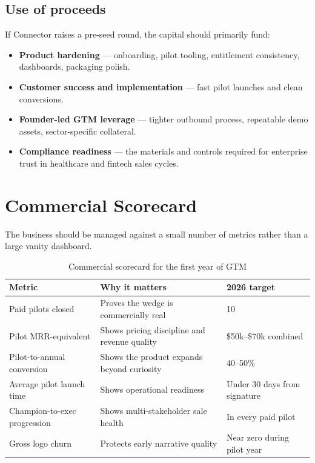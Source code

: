 \subsection{Use of proceeds}

If Connector raises a pre-seed round, the capital should primarily fund:

\begin{itemize}[leftmargin=1.5em,itemsep=2pt]
  \item \textbf{Product hardening} — onboarding, pilot tooling, entitlement
        consistency, dashboards, packaging polish.
  \item \textbf{Customer success and implementation} — fast pilot launches and
        clean conversions.
  \item \textbf{Founder-led GTM leverage} — tighter outbound process, repeatable
        demo assets, sector-specific collateral.
  \item \textbf{Compliance readiness} — the materials and controls required for
        enterprise trust in healthcare and fintech sales cycles.
\end{itemize}

\section{Commercial Scorecard}

The business should be managed against a small number of metrics rather than a
large vanity dashboard.

\begin{table}[H]
\centering
\renewcommand{\arraystretch}{1.45}
\begin{tabularx}{\textwidth}{@{}lXX@{}}
\toprule
\textbf{Metric} & \textbf{Why it matters} & \textbf{2026 target} \\
\midrule
Paid pilots closed & Proves the wedge is commercially real & 10 \\
Pilot MRR-equivalent & Shows pricing discipline and revenue quality & \$50k--\$70k combined \\
Pilot-to-annual conversion & Shows the product expands beyond curiosity & 40--50\% \\
Average pilot launch time & Shows operational readiness & Under 30 days from signature \\
Champion-to-exec progression & Shows multi-stakeholder sale health & In every paid pilot \\
Gross logo churn & Protects early narrative quality & Near zero during pilot year \\
\bottomrule
\end{tabularx}
\caption{Commercial scorecard for the first year of GTM}
\end{table}

